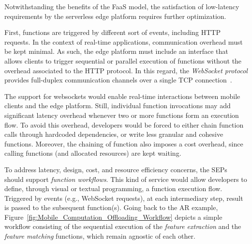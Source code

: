 \documentclass[letterpaper, 10 pt, conference]{ieeeconf}  %
\begin{document}
Notwithstanding the benefits of the FaaS model, the satisfaction of low-latency requirements by the serverless edge platform requires further optimization.

First, functions are triggered by different sort of events, including HTTP requests. In the context of real-time applications, communication overhead must be kept minimal. As such, the edge platform must include an interface that allows clients to trigger sequential or parallel execution of functions without the overhead associated to the HTTP protocol. In this regard, the \textit{WebSocket protocol}
provides full-duplex communication channels over a single TCP connection~\cite{}. %


The support for websockets would enable real-time interactions between mobile clients and the edge platform. Still, individual function invocations may add significant latency overhead whenever two or more functions form an execution flow. To avoid this overhead, developers would be forced to either chain function calls through hardcoded dependencies, or write less granular and cohesive functions. Moreover, the chaining of function also imposes a cost overhead, since calling functions (and allocated resources) are kept waiting.%

To address latency, design, cost, and resource efficiency concerns, the SEPs should support \textit{function workflows}. This kind of service would allow developers to define, through visual or textual programming, a function execution flow.
Triggered by events (e.g., WebSocket requests), at each intermediary step, result is passed to the subsequent function(s). Going back to the AR example, Figure~\ref{fig:Mobile_Computation_Offloading_Workflow} depicts a simple workflow consisting of the sequential execution of the \textit{feature extraction} and the \textit{feature matching} functions, which remain agnostic of each other.
\end{document}

